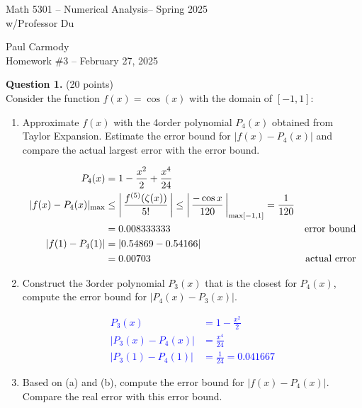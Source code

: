 \documentclass[10pt,a4paper]{report}
\newcommand{\CLASSNAME}{Math 5301 -- Numerical Analysis}
\newcommand{\STUDENTNAME}{Paul Carmody}
\newcommand{\ASSIGNMENT}{Homework \#3 }
\newcommand{\DUEDATE}{February 27, 2025}
\newcommand{\SEMESTER}{Spring 2025}
\newcommand{\BLUE}[1]{\textcolor{blue}{#1}}
\begin{document}

\begin{center}
	\Large{\CLASSNAME -- \SEMESTER} \\
	\large{ w/Professor Du}
\end{center}
\begin{center}
	\STUDENTNAME \\
	\ASSIGNMENT -- \DUEDATE\\
\end{center} 

\textbf{Question 1.} (20 points) \\

Consider the function $f(x) = \cos(x)$ with the domain of $[-1,1]$:

\begin{enumerate}[label=(\alph*)]

	\item Approximate $f(x)$ with the 4\ITH order polynomial $P_4(x)$ obtained from Taylor Expansion.  Estimate the error bound for $|f(x)-P_4(x)|$ and compare the actual largest error with the error bound.
	
	\BLUE{\begin{align*}
			P_4(x) &= 1 - \frac{x^2}{2}+\frac{x^4}{24} \\
			|f(x)-P_4(x)|_{\max} &\le \left |\,  \frac{f^{(5)}(\zeta(x))}{5!}  \,\right | \le \left |\,  \frac{-\cos x }{120}  \,\right |_{\max [-1,1]} = \frac{1}{120}\\
			&= 0.008333333 &\text{error bound}\\
		|f(1)-P_4(1)| &= |0.54869 - 0.54166|\\
			&= 0.00703 &\text{actual error}
		\end{align*}	
	}
	
	\item Construct the 3\TRD order polynomial $P_3(x)$ that is the closest for $P_4(x)$, compute the error bound for $|P_4(x)-P_3(x)|$.
	
	\BLUE{\begin{align*}
		P_3(x) &= 1 - \frac{x^2}{2} \\
		|P_3(x) - P_4(x)| &= \frac{x^4}{24} \\
		|P_3(1) - P_4(1)| &= \frac{1}{24} = 0.041667
	\end{align*}
	}
	
	\item Based on (a) and (b), compute the error bound for $|f(x)-P_4(x)|$.  Compare the real error with this error bound.
\end{enumerate}
\end{document}
